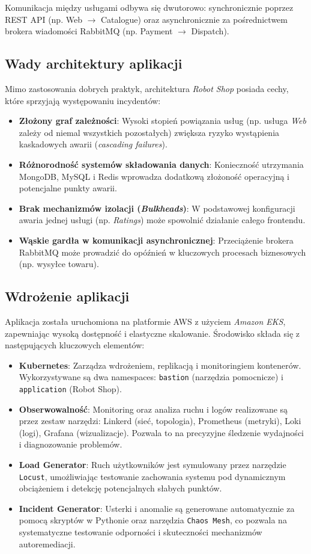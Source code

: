 Komunikacja między usługami odbywa się dwutorowo: synchronicznie poprzez REST API (np. Web $\rightarrow$ Catalogue) oraz asynchronicznie za pośrednictwem brokera wiadomości RabbitMQ (np. Payment $\rightarrow$ Dispatch).

\subsection{Wady architektury aplikacji}
Mimo zastosowania dobrych praktyk, architektura \textit{Robot Shop} posiada cechy, które sprzyjają występowaniu incydentów:
\begin{itemize}
    \item \textbf{Złożony graf zależności}: Wysoki stopień powiązania usług (np. usługa \textit{Web} zależy od niemal wszystkich pozostałych) zwiększa ryzyko wystąpienia kaskadowych awarii (\textit{cascading failures}).
    \item \textbf{Różnorodność systemów składowania danych}: Konieczność utrzymania MongoDB, MySQL i Redis wprowadza dodatkową złożoność operacyjną i potencjalne punkty awarii.
    \item \textbf{Brak mechanizmów izolacji (\textit{Bulkheads})}: W podstawowej konfiguracji awaria jednej usługi (np. \textit{Ratings}) może spowolnić działanie całego frontendu.
    \item \textbf{Wąskie gardła w komunikacji asynchronicznej}: Przeciążenie brokera RabbitMQ może prowadzić do opóźnień w kluczowych procesach biznesowych (np. wysyłce towaru).
\end{itemize}

\subsection{Wdrożenie aplikacji}
Aplikacja została uruchomiona na platformie AWS z użyciem \textit{Amazon EKS}, zapewniając wysoką dostępność i elastyczne skalowanie. Środowisko składa się z następujących kluczowych elementów:
\begin{itemize}
    \item \textbf{Kubernetes}: Zarządza wdrożeniem, replikacją i monitoringiem kontenerów. Wykorzystywane są dwa namespaces: \texttt{bastion} (narzędzia pomocnicze) i \texttt{application} (Robot Shop).
    \item \textbf{Obserwowalność}: Monitoring oraz analiza ruchu i logów realizowane są przez zestaw narzędzi: Linkerd (sieć, topologia), Prometheus (metryki), Loki (logi), Grafana (wizualizacje). Pozwala to na precyzyjne śledzenie wydajności i diagnozowanie problemów.
    \item \textbf{Load Generator}: Ruch użytkowników jest symulowany przez narzędzie \texttt{Locust}, umożliwiając testowanie zachowania systemu pod dynamicznym obciążeniem i detekcję potencjalnych słabych punktów.
    \item \textbf{Incident Generator}: Usterki i anomalie są generowane automatycznie za pomocą skryptów w Pythonie oraz narzędzia \texttt{Chaos Mesh}, co pozwala na systematyczne testowanie odporności i skuteczności mechanizmów autoremediacji.
\end{itemize}

